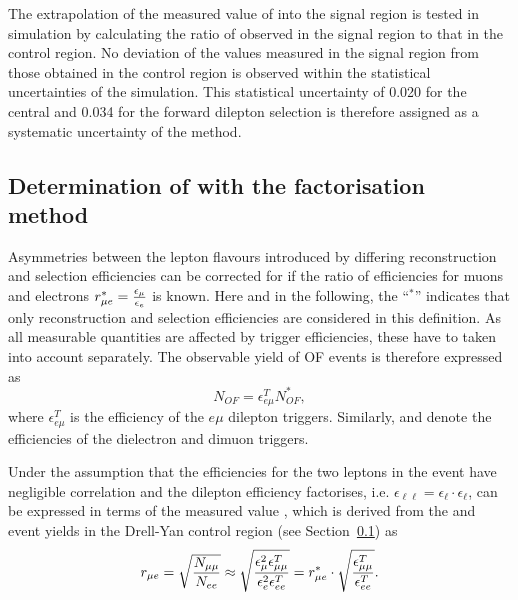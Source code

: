 The extrapolation of the measured value of \Rsfof into the signal region is tested in simulation by calculating the ratio of \Rsfof observed in the signal region to that in the control region. No deviation of the values measured in the signal region from those obtained in the control region is observed within the statistical uncertainties of the simulation. This statistical uncertainty of 0.020 for the central and 0.034 for the forward dilepton selection is therefore assigned as a systematic uncertainty of the method. 



\subsection{Determination of \Rsfof with the factorisation method}
\label{sec:rmue}
Asymmetries between the lepton flavours introduced by differing reconstruction and selection efficiencies can be corrected for if the ratio of efficiencies for muons and electrons $r_{\mu e}^{*} = \frac{\epsilon_{\mu}}{\epsilon_{e}}$ is known. Here and in the following, the ``$^{*}$'' indicates that only reconstruction and selection efficiencies are considered in this definition. As all measurable quantities are affected by trigger efficiencies, these have to taken into account separately. The observable yield of OF events is therefore expressed as 
\begin{equation*}
N_{OF} = \epsilon_{e\mu}^T N_{OF}^{*},
\end{equation*}
where $\epsilon_{e\mu}^T$ is the efficiency of the $e\mu$ dilepton triggers. Similarly, \effeet and \effmmt denote the efficiencies of the dielectron and dimuon triggers.

Under the assumption that the efficiencies for the two leptons in the event have negligible correlation and the dilepton efficiency factorises, i.e. $\epsilon_{\ell\ell} = \epsilon_{\ell}\cdot\epsilon_{\ell}$, \rmuestar can be expressed in terms of the measured value \rmue, which is derived from the \EE and \MM event yields in the Drell-Yan control region (see Section~\ref{sec:rmue}) as 
\begin{equation*}
r_{\mu e}  = \sqrt{\frac{N_{\mu\mu}}{N_{ee}}} \approx \sqrt{\frac{\epsilon_{\mu}^2 \epsilon_{\mu\mu}^T}{\epsilon_{e}^2 \epsilon_{ee}^T}} = r_{\mu e}^{*} \cdot \sqrt{\frac{\epsilon_{\mu\mu}^T}{\epsilon_{ee}^T}}.
\end{equation*}

